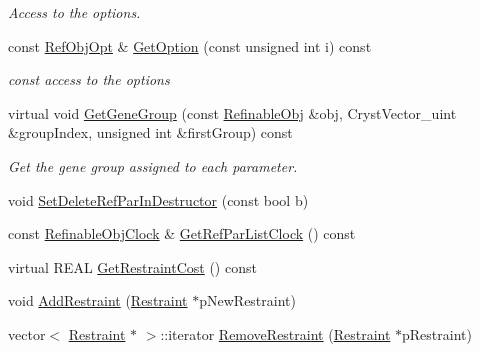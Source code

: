 \begin{DoxyCompactItemize}
\begin{DoxyCompactList}\small\item\em Access to the options. \end{DoxyCompactList}\item 
\mbox{\label{class_obj_cryst_1_1_refinable_obj_a8332d89bd65d95fedf5a49ecbc2e7d21}} 
const \mbox{\hyperlink{class_obj_cryst_1_1_ref_obj_opt}{Ref\+Obj\+Opt}} \& \mbox{\hyperlink{class_obj_cryst_1_1_refinable_obj_a8332d89bd65d95fedf5a49ecbc2e7d21}{Get\+Option}} (const unsigned int i) const
\begin{DoxyCompactList}\small\item\em const access to the options \end{DoxyCompactList}\item 
virtual void \mbox{\hyperlink{class_obj_cryst_1_1_refinable_obj_ace4e00bd7787b2f490a1e4bfe85dbe89}{Get\+Gene\+Group}} (const \mbox{\hyperlink{class_obj_cryst_1_1_refinable_obj}{Refinable\+Obj}} \&obj, Cryst\+Vector\+\_\+uint \&group\+Index, unsigned int \&first\+Group) const
\begin{DoxyCompactList}\small\item\em Get the gene group assigned to each parameter. \end{DoxyCompactList}\item 
void \mbox{\hyperlink{class_obj_cryst_1_1_refinable_obj_a33f94e9c9c0717ea77c8b9427e9e137e}{Set\+Delete\+Ref\+Par\+In\+Destructor}} (const bool b)
\item 
const \mbox{\hyperlink{class_obj_cryst_1_1_refinable_obj_clock}{Refinable\+Obj\+Clock}} \& \mbox{\hyperlink{class_obj_cryst_1_1_refinable_obj_a7cd089596963f9b08712075eac7edef4}{Get\+Ref\+Par\+List\+Clock}} () const
\item 
virtual R\+E\+AL \mbox{\hyperlink{class_obj_cryst_1_1_refinable_obj_acae0de2f341ce808d1d656dad2f3fa57}{Get\+Restraint\+Cost}} () const
\item 
void \mbox{\hyperlink{class_obj_cryst_1_1_refinable_obj_a0eec1ccf5ba9769e5c6a82a85ecf451d}{Add\+Restraint}} (\mbox{\hyperlink{class_obj_cryst_1_1_restraint}{Restraint}} $\ast$p\+New\+Restraint)
\item 
vector$<$ \mbox{\hyperlink{class_obj_cryst_1_1_restraint}{Restraint}} $\ast$ $>$\+::iterator \mbox{\hyperlink{class_obj_cryst_1_1_refinable_obj_a2645dadc4118c81e26fdc9d5145b5e1f}{Remove\+Restraint}} (\mbox{\hyperlink{class_obj_cryst_1_1_restraint}{Restraint}} $\ast$p\+Restraint)
\item 

\end{DoxyCompactItemize}
